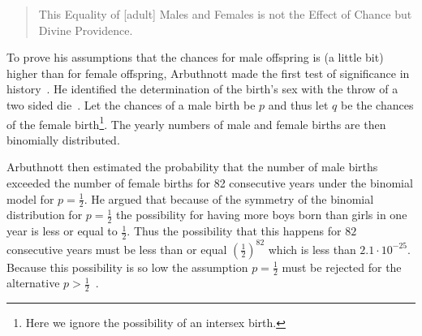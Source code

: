 \begin{quotation}
    This Equality of [adult] Males and Females is not the Effect of Chance but Divine Providence.
\end{quotation}

To prove his assumptions that the chances for male offspring is (a little bit) higher than for female offspring, Arbuthnott made the first test of significance in history~\cite[p. 276]{hald1}. He identified the determination of the birth's sex with the throw of a two sided die~\cite[pp. 275-276]{hald1}. Let the chances of a male birth be $p$ and thus let $q$ be the chances of the female birth\footnote{Here we ignore the possibility of an intersex birth. }. The yearly numbers of male and female births are then binomially distributed.

Arbuthnott then estimated the probability that the number of male births exceeded the number of female births for 82 consecutive years under the binomial model for $p=\tfrac 12$. He argued that because of the symmetry of the binomial distribution for $p=\tfrac 12$ the possibility for having more boys born than girls in one year is less or equal to $\tfrac 12$. Thus the possibility that this happens for $82$ consecutive years must be less than or equal $\left(\tfrac 12\right)^{82}$ which is less than $2.1\cdot 10^{-25}$. Because this possibility is so low the assumption $p=\tfrac 12$ must be rejected for the alternative $p > \tfrac 12$~\cite[p. 278]{hald1}.
